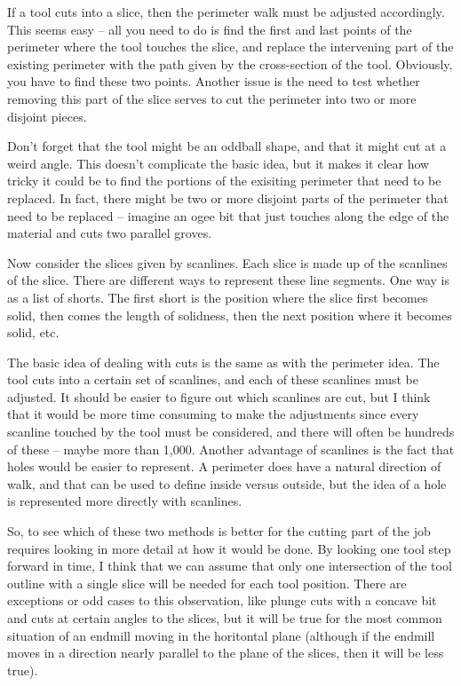 \documentclass[titlepage,oneside,10pt]{article}
\begin{document}
If a tool cuts into a slice, then the perimeter walk must be adjusted
accordingly. This seems easy -- all you need to do is find the first
and last points of the perimeter where the tool touches the slice, and
replace the intervening part of the existing perimeter with the path
given by the cross-section of the tool. Obviously, you have to find
these two points. Another issue is the need to test whether removing
this part of the slice serves to cut the perimeter into two or more
disjoint pieces. 

Don't forget that the tool might be an oddball shape, and that it might
cut at a weird angle. This doesn't complicate the basic idea, but it
makes it clear how tricky it could be to find the portions of the
exisiting perimeter that need to be replaced. In fact, there might be
two or more disjoint parts of the perimeter that need to be replaced
-- imagine an ogee bit that just touches along the edge of the
material and cuts two parallel groves.

Now consider the slices given by scanlines. Each slice is made up of
the scanlines of the slice. There are different ways to represent
these line segments. One way is as a list of shorts. The first short
is the position where the slice first becomes solid, then comes the
length of solidness, then the next position where it becomes solid,
etc. 

The basic idea of dealing with cuts is the same as with the perimeter
idea. The tool cuts into a certain set of scanlines, and each of these
scanlines must be adjusted. It should be easier to figure out which
scanlines are cut, but I think that it would be more time consuming to
make the adjustments since every scanline touched by the tool must be
considered, and there will often be hundreds of these -- maybe more
than 1,000. Another advantage of scanlines is the fact that holes would be
easier to represent. A perimeter does have a natural direction of walk, and
that can be used to define inside versus outside, but the idea of a
hole is represented more directly with scanlines.

So, to see which of these two methods is better for the cutting part
of the job requires looking in more detail at how it would be done. By
looking one tool step forward in time, I think that we can assume that
only one intersection of the tool outline with a single slice will be
needed for each tool position. There are exceptions or odd cases to this
observation, like plunge cuts with a concave bit and cuts at certain
angles to the slices, but it will be true for the most common
situation of an endmill moving in the horitontal plane (although if
the endmill moves in a direction nearly parallel to the plane of the
slices, then it will be less true).
\end{document}
